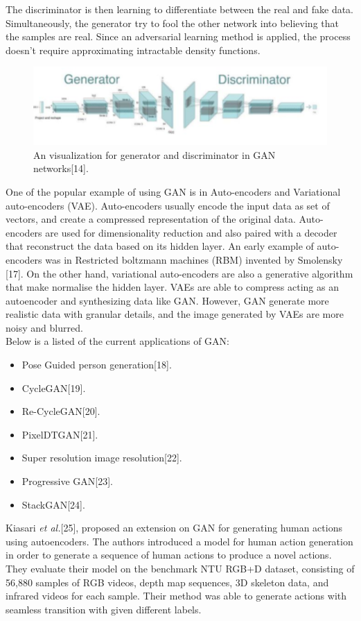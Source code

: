 \hspace{5mm} The discriminator is then learning to differentiate between the real and fake data. Simultaneously, the generator try to fool the other network into believing that the samples are real. Since an adversarial learning method is applied, the process doesn't require approximating intractable density functions.\\
\begin{figure}[ht]
\centering
\includegraphics{Figures/gan}
\decoRule
\caption[An visualization for generator and discriminator in GAN networks "14".]{An visualization for generator and discriminator in GAN networks[14].}
\label{fig:la}
\end{figure}
One of the popular example of using GAN is in Auto-encoders and Variational auto-encoders (VAE). Auto-encoders usually encode the input data as set of vectors, and create a compressed representation of the original data. Auto-encoders are used for dimensionality reduction and also paired with a decoder that reconstruct the data based on its hidden layer. An early example of auto-encoders was in Restricted boltzmann machines (RBM) invented by Smolensky [17]. On the other hand, variational auto-encoders are also a generative algorithm that make normalise the hidden layer. VAEs are able to compress acting as an autoencoder and synthesizing data like GAN. However, GAN generate more realistic data with granular details, and the image generated by VAEs are more noisy and blurred.\\
\hspace{5mm} Below is a listed of the current applications of GAN:
\begin{itemize}
    \item Pose Guided person generation[18].
    \item CycleGAN[19].
    \item Re-CycleGAN[20].
    \item PixelDTGAN[21].
    \item Super resolution image resolution[22].
    \item Progressive GAN[23].
    \item StackGAN[24].
\end{itemize}
\hspace{5mm} Kiasari \textit{et al.}[25], proposed an extension on GAN for generating human actions using autoencoders. The authors introduced a model for human action generation in order to generate a sequence of human actions to produce a novel actions. They evaluate their model on the benchmark NTU RGB+D dataset, consisting of 56,880 samples of RGB videos, depth map sequences, 3D skeleton data, and infrared videos for each sample. Their method was able to generate actions with seamless transition with given different labels.
